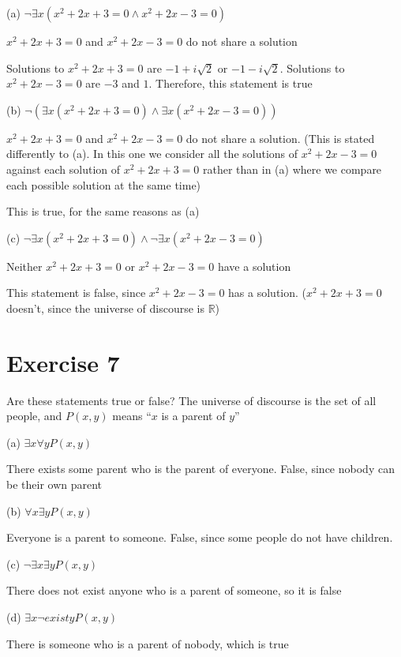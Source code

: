 \documentclass[11pt]{article}
\begin{document}
\noindent (a) $\neg \exists x (x^2 + 2x + 3 = 0 \wedge x^2 + 2x - 3 = 0)$

$x^2 + 2x + 3 = 0$ and $x^2 + 2x - 3 = 0$ do not share a solution

Solutions to $x^2 + 2x + 3 = 0$ are $-1 + i \sqrt{2}$ or $-1 - i \sqrt{2}$. 
Solutions to $x^2 + 2x - 3 = 0$ are $-3$ and $1$. 
Therefore, this statement is true

\noindent (b) $\neg (\exists x (x^2 + 2x + 3 = 0) \wedge \exists x (x^2 + 2x - 3 = 0))$

$x^2 + 2x + 3 = 0$ and $x^2 + 2x - 3 = 0$ do not share a solution.
(This is stated differently to (a). In this one we consider all the solutions 
of $x^2 + 2x - 3 = 0$ against each solution of $x^2 + 2x + 3 = 0$ rather than 
in (a) where we compare each possible solution at the same time)

This is true, for the same reasons as (a)

\noindent (c) $\neg \exists x (x^2 + 2x + 3 = 0) \wedge \neg \exists x (x^2 + 2x - 3 = 0)$

Neither $x^2 + 2x + 3 = 0$ or $x^2 + 2x - 3 = 0$ have a solution

This statement is false, since $x^2 + 2x - 3 = 0$ has a solution. 
($x^2 + 2x + 3 = 0$ doesn't, since the universe of discourse is $\mathbb{R}$)

\section*{Exercise 7}

\noindent Are these statements true or false? The universe of discourse is the 
set of all people, and $P(x, y)$ means ``$x$ is a parent of $y$''

\noindent (a) $\exists x \forall y P(x, y)$

There exists some parent who is the parent of everyone. False, since nobody 
can be their own parent 

\noindent (b) $\forall x \exists y P(x, y)$

Everyone is a parent to someone. False, since some people do not have children.

\noindent (c) $\neg \exists x \exists y P(x, y)$

There does not exist anyone who is a parent of someone, so it is false

\noindent (d) $\exists x \neg exist y P(x, y)$

There is someone who is a parent of nobody, which is true 
\end{document}
